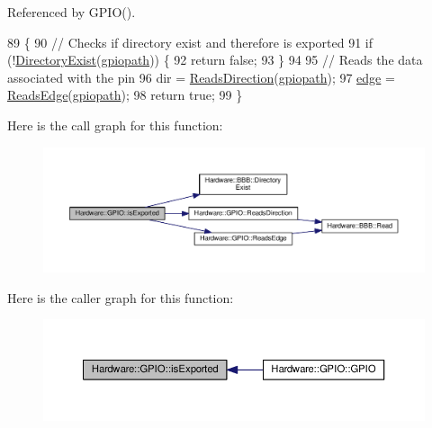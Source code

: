 Referenced by G\+P\+I\+O().


\begin{DoxyCode}
89                                                             \{
90   \textcolor{comment}{// Checks if directory exist and therefore is exported}
91   \textcolor{keywordflow}{if} (!\hyperlink{class_hardware_1_1_b_b_b_adf431d8e0e8899f7aa16c350a2270e79}{DirectoryExist}(\hyperlink{class_hardware_1_1_g_p_i_o_ac47062ed6aba52b9e8506e1575bf5061}{gpiopath})) \{
92     \textcolor{keywordflow}{return} \textcolor{keyword}{false};
93   \}
94 
95   \textcolor{comment}{// Reads the data associated with the pin}
96   dir = \hyperlink{class_hardware_1_1_g_p_i_o_a875d4f95ff3e6a70196660faa0477cf5}{ReadsDirection}(\hyperlink{class_hardware_1_1_g_p_i_o_ac47062ed6aba52b9e8506e1575bf5061}{gpiopath});
97   \hyperlink{class_hardware_1_1_g_p_i_o_adf15f74f053069029e99934e28c109e0}{edge} = \hyperlink{class_hardware_1_1_g_p_i_o_ac5a3c6d1a0ce58a0b2ee0752623810e4}{ReadsEdge}(\hyperlink{class_hardware_1_1_g_p_i_o_ac47062ed6aba52b9e8506e1575bf5061}{gpiopath});
98   \textcolor{keywordflow}{return} \textcolor{keyword}{true};
99 \}
\end{DoxyCode}


Here is the call graph for this function\+:\nopagebreak
\begin{figure}[H]
\begin{center}
\leavevmode
\includegraphics[width=350pt]{class_hardware_1_1_g_p_i_o_a423f9ac92259cacdca0c82c3ee9b1cdd_cgraph}
\end{center}
\end{figure}




Here is the caller graph for this function\+:\nopagebreak
\begin{figure}[H]
\begin{center}
\leavevmode
\includegraphics[width=350pt]{class_hardware_1_1_g_p_i_o_a423f9ac92259cacdca0c82c3ee9b1cdd_icgraph}
\end{center}
\end{figure}


